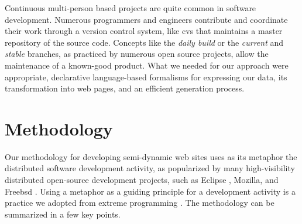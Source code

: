 \documentclass{article}
\begin{document}
Continuous multi-person based projects are quite
common in software development.
Numerous programmers and engineers contribute and coordinate their work
through a version control system, like {\sc cvs} \cite{BF01} that
maintains a master repository of the source code.
Concepts like the \textit{daily build} \cite{KAL00} or the
\textit{current} and \textit{stable} branches, as practiced by
numerous open source projects, allow the maintenance
of a known-good product.
What we needed for our approach were appropriate,
declarative language-based formalisms for expressing our data,
its transformation into web pages, and an efficient
generation process.

\section{Methodology}
\label{sec:meth}
Our methodology for developing semi-dynamic web sites uses as
its metaphor the distributed software development activity, as popularized
by many high-visibility distributed open-source development projects,
such as Eclipse \cite{GB04}, Mozilla, and Free{\sc bsd} \cite{Jor01}.
Using a metaphor as a guiding principle for a development activity
is a practice we adopted from extreme programming \cite{Bec00}.
The methodology can be summarized in a few key points.
\end{document}

